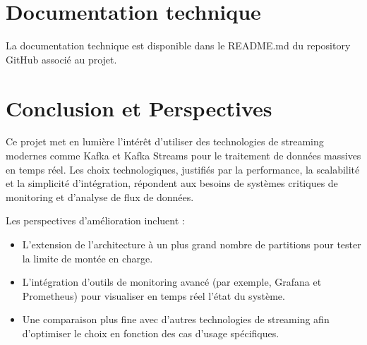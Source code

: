 \section{Documentation technique}\label{sec:documentation-technique}

La documentation technique est disponible dans le README.md du repository GitHub associé au projet.


\section{Conclusion et Perspectives}

Ce projet met en lumière l’intérêt d’utiliser des technologies de streaming modernes comme Kafka et Kafka Streams pour le traitement de données massives en temps réel.
Les choix technologiques, justifiés par la performance, la scalabilité et la simplicité d’intégration, répondent aux besoins de systèmes critiques de monitoring et d’analyse de flux de données.

Les perspectives d’amélioration incluent :
\begin{itemize}
    \item L’extension de l’architecture à un plus grand nombre de partitions pour tester la limite de montée en charge.
    \item L’intégration d’outils de monitoring avancé (par exemple, Grafana et Prometheus) pour visualiser en temps réel l’état du système.
    \item Une comparaison plus fine avec d’autres technologies de streaming afin d’optimiser le choix en fonction des cas d’usage spécifiques.
\end{itemize}



